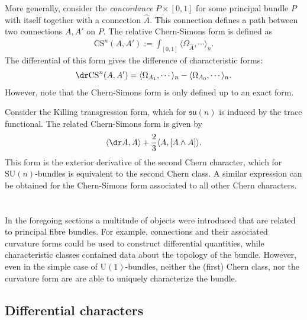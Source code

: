     More generally, consider the \textit{concordance} $P\times[0,1]$ for some principal bundle $P$ with itself together with a connection $\hat{A}$. This connection defines a path between two connections $A,A'$ on $P$. The relative Chern-Simons form is defined as
    \begin{gather}
        \mathrm{CS}^n(A,A') := \int_{[0,1]}\langle\Omega_{\hat{A}},\cdots\rangle_n.
    \end{gather}
    The differential of this form gives the difference of characteristic forms:
    \begin{gather}
        \dr\mathrm{CS}^n(A,A') = \langle\Omega_{A_1},\cdots\rangle_n - \langle\Omega_{A_0},\cdots\rangle_n.
    \end{gather}
    However, note that the Chern-Simons form is only defined up to an exact form.

    \begin{example}
        Consider the Killing transgression form, which for $\mathfrak{su}(n)$ is induced by the trace functional. The related Chern-Simons form is given by
        \begin{gather}
            \langle\dr A,A\rangle + \frac{2}{3}\langle A,[A\wedge A] \rangle.
        \end{gather}
        This form is the exterior derivative of the second Chern character, which for $\mathrm{SU}(n)$-bundles is equivalent to the second Chern class. A similar expression can be obtained for the Chern-Simons form associated to all other Chern characters.
    \end{example}

\section{}\label{section:differential_cohomology}

    In the foregoing sections a multitude of objects were introduced that are related to principal fibre bundles. For example, connections and their associated curvature forms could be used to construct differential quantities, while characteristic classes contained data about the topology of the bundle. However, even in the simple case of $\mathrm{U}(1)$-bundles, neither the (first) Chern class, nor the curvature form are are able to uniquely characterize the bundle.

\subsection{Differential characters}

